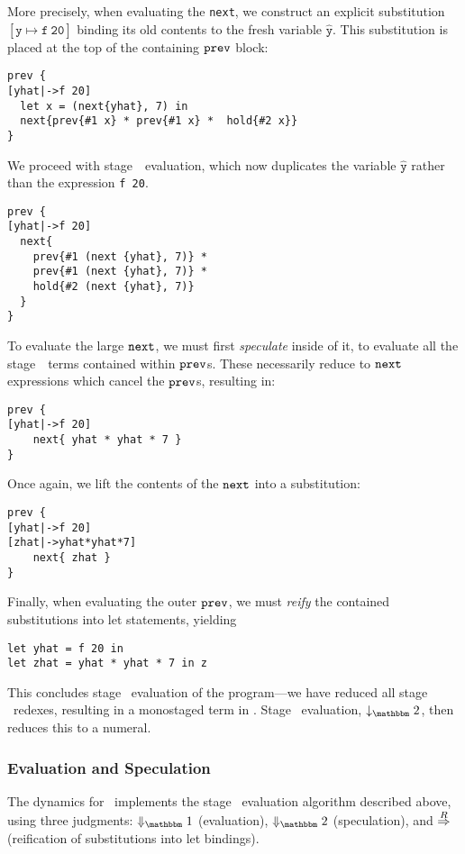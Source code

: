 More precisely, when evaluating the \verb|next|, we construct an explicit
substitution $\mathtt{[\hat y\mapsto f~20]}$ binding its old contents to the
fresh variable $\mathtt{\hat y}$. This substitution is placed at the top of the
containing ${\tt prev}$ block:
\begin{lstlisting} 
prev {
[yhat|->f 20]
  let x = (next{yhat}, 7) in
  next{prev{#1 x} * prev{#1 x} *  hold{#2 x}}
}
\end{lstlisting}
We proceed with stage~\bbone\ evaluation, which now duplicates the variable
$\mathtt{\hat y}$ rather than the expression \verb|f 20|.
\begin{lstlisting} 
prev {
[yhat|->f 20]
  next{
    prev{#1 (next {yhat}, 7)} * 
    prev{#1 (next {yhat}, 7)} *
    hold{#2 (next {yhat}, 7)}
  }
}
\end{lstlisting}
To evaluate the large ${\tt next}$, we must first \emph{speculate} inside of it, to
evaluate all the stage~\bbone\ terms contained within ${\tt prev}$s. These
necessarily reduce to ${\tt next}$ expressions which cancel the ${\tt prev}$s, resulting
in:
\begin{lstlisting} 
prev {
[yhat|->f 20]
    next{ yhat * yhat * 7 }
}
\end{lstlisting}
Once again, we lift the contents of the ${\tt next}$ into a substitution:
\begin{lstlisting} 
prev {
[yhat|->f 20]
[zhat|->yhat*yhat*7]
    next{ zhat }
}
\end{lstlisting}
Finally, when evaluating the outer ${\tt prev}$, we must {\em reify} the contained substitutions into let statements, yielding
\begin{lstlisting} 
let yhat = f 20 in
let zhat = yhat * yhat * 7 in z
\end{lstlisting}

This concludes stage \bbone\ evaluation of the program---we have reduced all
stage \bbone\ redexes, resulting in a monostaged term in \langTwo. Stage \bbtwo\
evaluation, $\tworedsym$, then reduces this to a numeral.

\subsubsection{Evaluation and Speculation}
\label{ssec:dynamics}



The dynamics for \lang\ implements the stage \bbone\ evaluation algorithm
described above, using three judgments: $\redonesym$ (evaluation), $\redtwosym$
(speculation), and $\overset{R}\Rightarrow$ (reification of substitutions into let
bindings).

